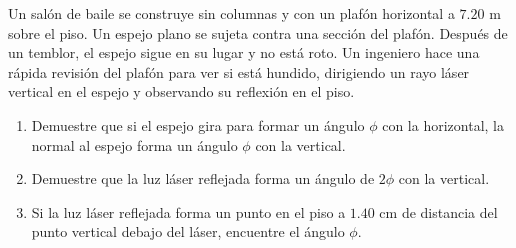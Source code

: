 \item Un salón de baile se construye sin columnas y con un plafón horizontal a $7.20\text{ m}$ sobre el piso. Un espejo plano se sujeta contra una sección del plafón. Después de un temblor, el espejo sigue en su lugar y no está roto. Un ingeniero hace una rápida revisión del plafón para ver si está hundido, dirigiendo un rayo láser vertical en el espejo y observando su reflexión en el piso.
\begin{enumerate}
    \item Demuestre que si el espejo gira para formar un ángulo $\phi$ con la horizontal, la normal al espejo forma un ángulo $\phi$ con la vertical.
    \item Demuestre que la luz láser reflejada forma un ángulo de $2\phi$ con la vertical.
    \item Si la luz láser reflejada forma un punto en el piso a $1.40\text{ cm}$ de distancia del punto vertical debajo del láser, encuentre el ángulo $\phi$.
\end{enumerate}